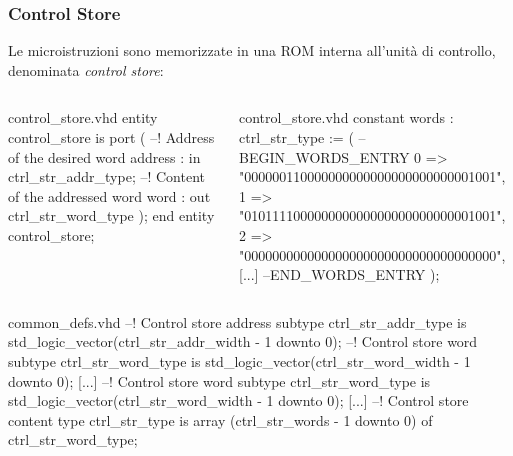 \documentclass{beamer}
\begin{document}
\begin{frame}[fragile]
  \frametitle{Control Store}
  Le microistruzioni sono memorizzate in una ROM interna all'unità di controllo,
  denominata \textit{control store}:
  \begin{columns}
    \begin{column}{0.5\textwidth}
\begin{myvhdl}{control\_store.vhd}
entity control_store is
  port (
    --! Address of the desired word
    address : in  ctrl_str_addr_type;
    --! Content of the addressed word
    word    : out ctrl_str_word_type
    );
end entity control_store;
\end{myvhdl}
\end{column}
\begin{column}{0.5\textwidth}
\begin{myvhdl}{control\_store.vhd}
constant words : ctrl_str_type := (
--BEGIN_WORDS_ENTRY
0 => "000000110000000000000000000000001001",
1 => "010111100000000000000000000000001001",
2 => "000000000000000000000000000000000000",
[...]
--END_WORDS_ENTRY
);
\end{myvhdl}
\end{column}
\end{columns}
\begin{myvhdl}{common\_defs.vhd}
--! Control store address
subtype ctrl_str_addr_type is std_logic_vector(ctrl_str_addr_width - 1 downto 0);
--! Control store word
subtype ctrl_str_word_type is std_logic_vector(ctrl_str_word_width - 1 downto 0);
[...]
--! Control store word
subtype ctrl_str_word_type is std_logic_vector(ctrl_str_word_width - 1 downto 0);
[...]
--! Control store content
type ctrl_str_type is array (ctrl_str_words - 1 downto 0) of ctrl_str_word_type;
\end{myvhdl}
\end{frame}
\end{document}
